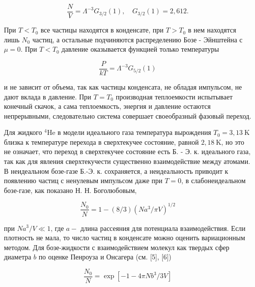 \documentclass[10pt]{article}
\begin{document}
\[

\frac{N}{V}=\Lambda^{-3} G_{3 / 2}(1), \quad G_{3 / 2}(1)=2,612 .

\]



При $T<T_{0}$ все частицы находятся в конденсате, при $T>T_{0}$ в нем находятся лишь $N_{0}$ частиц, а остальные подчиняются распределению Бозе - Эйнштейна с $\mu=0$. При $T<T_{0}$ давление оказывается функцией только температуры



\[

\frac{P}{k T}=\Lambda^{-3} G_{5 / 2}(1)

\]



и не зависит от объема, так как частицы конденсата, не обладая импульсом, не дают вклада в давление. При $T=T_{0}$ производная теплоемкости испытывает конечный скачок, а сама теплоемкость, энергия и давление остаются непрерывными, следовательно система совершает своеобразный фазовый переход.



Для жидкого ${ }^{4} \mathrm{He}$ в модели идеального газа температура вырождения $T_{0}=3,13 \mathrm{~K}$ близка к температуре перехода в сверхтекучее состояние, равной $2,18 \mathrm{~K}$, но это не означает, что переход в сверхтекучее состояние есть Б. - Э. к. идеального газа, так как для явления сверхтекучести существенно взаимодействие между атомами. В неидеальном бозе-газе Б.-Э. к. сохраняется, а неидеальность приводит к появлению частиц с ненулевым импульсом даже при $T=0$, в слабонеидеальном бозе-газе, как показано Н. Н. Боголюбовым,



\[

\frac{N_{0}}{N}=1-(8 / 3)\left(N a^{3} / \pi V\right)^{1 / 2}

\]



при $N a^{3} / V \ll 1$, где $a-$ длина рассеяния для потенциала взаимодействия. Если плотность не мала, то число частиц в конденсате можно оценить вариационным методом. Для бозе-жидкости с взаимодействием молекул как твердых сфер диаметра $b$ по оценке Пенроуза и Онсагера (см. [5], [6])



\[

\frac{N_{0}}{N}=\exp \left[-1-4 \pi N b^{3} / 3 V\right]

\]
\end{document}
